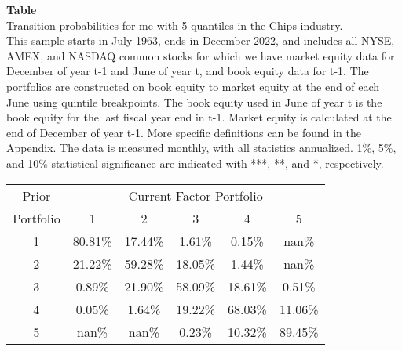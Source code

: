 \begin{table*}[ht!]
\raggedright
{}
\label{tab: transition_probs_me_Chips_with_5_quantiles}
\textbf{Table \thetable} \\
Transition probabilities for me with 5 quantiles in the Chips industry. \\
\hspace*{1em}This sample starts in July 1963, ends in December 2022, and includes all NYSE, AMEX, and NASDAQ common stocks for which we have market equity data for December of year t-1 and June of year t, and book equity data for t-1. The portfolios are constructed on book equity to market equity at the end of each June using quintile breakpoints.  The book equity used in June of year t is the book equity for the last fiscal year end in t-1.  Market equity is calculated at the end of December of year t-1.  More specific definitions can be found in the Appendix.  The data is measured monthly, with all statistics annualized.  1\%, 5\%, and 10\% statistical significance are indicated with ***, **, and *, respectively. \\
\vspace{0.5em}
\centering
\begin{adjustbox}{max width=\textwidth}
\begin{tabular}{@{}cccccc@{}}
\toprule
Prior & \multicolumn{5}{c}{Current Factor Portfolio} \\
Portfolio & 1 & 2 & 3 & 4 & 5 \\
\midrule
1 & 80.81\% & 17.44\% & 1.61\% & 0.15\% & nan\% \\
2 & 21.22\% & 59.28\% & 18.05\% & 1.44\% & nan\% \\
3 & 0.89\% & 21.90\% & 58.09\% & 18.61\% & 0.51\% \\
4 & 0.05\% & 1.64\% & 19.22\% & 68.03\% & 11.06\% \\
5 & nan\% & nan\% & 0.23\% & 10.32\% & 89.45\% \\
\bottomrule
\end{tabular}
\end{adjustbox}
\end{table*}
